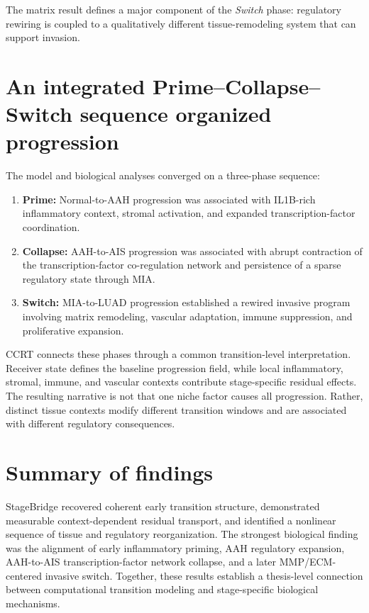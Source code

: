 The matrix result defines a major component of the \emph{Switch} phase: regulatory rewiring is coupled to a qualitatively different tissue-remodeling system that can support invasion.


\section{An integrated Prime--Collapse--Switch sequence organized progression}

The model and biological analyses converged on a three-phase sequence:

\begin{enumerate}
    \item \textbf{Prime:} Normal-to-AAH progression was associated with IL1B-rich inflammatory context, stromal activation, and expanded transcription-factor coordination.
    \item \textbf{Collapse:} AAH-to-AIS progression was associated with abrupt contraction of the transcription-factor co-regulation network and persistence of a sparse regulatory state through MIA.
    \item \textbf{Switch:} MIA-to-LUAD progression established a rewired invasive program involving matrix remodeling, vascular adaptation, immune suppression, and proliferative expansion.
\end{enumerate}

CCRT connects these phases through a common transition-level interpretation. Receiver state defines the baseline progression field, while local inflammatory, stromal, immune, and vascular contexts contribute stage-specific residual effects. The resulting narrative is not that one niche factor causes all progression. Rather, distinct tissue contexts modify different transition windows and are associated with different regulatory consequences.

\section{Summary of findings}

StageBridge recovered coherent early transition structure, demonstrated measurable context-dependent residual transport, and identified a nonlinear sequence of tissue and regulatory reorganization. The strongest biological finding was the alignment of early inflammatory priming, AAH regulatory expansion, AAH-to-AIS transcription-factor network collapse, and a later MMP/ECM-centered invasive switch. Together, these results establish a thesis-level connection between computational transition modeling and stage-specific biological mechanisms.

